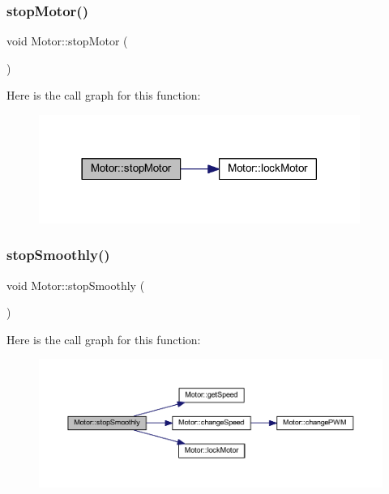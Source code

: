 \subsubsection{\texorpdfstring{stop\+Motor()}{stopMotor()}}
{\footnotesize\ttfamily void Motor\+::stop\+Motor (\begin{DoxyParamCaption}{ }\end{DoxyParamCaption})}

Here is the call graph for this function\+:\nopagebreak
\begin{figure}[H]
\begin{center}
\leavevmode
\includegraphics[width=297pt]{class_motor_a17eb92ef52d3cb10bc9f6b88b7c34dcc_cgraph}
\end{center}
\end{figure}
\mbox{\label{class_motor_af69697d5adb51106f4352c481d67fedd}} 
\subsubsection{\texorpdfstring{stop\+Smoothly()}{stopSmoothly()}}
{\footnotesize\ttfamily void Motor\+::stop\+Smoothly (\begin{DoxyParamCaption}{ }\end{DoxyParamCaption})}

Here is the call graph for this function\+:\nopagebreak
\begin{figure}[H]
\begin{center}
\leavevmode
\includegraphics[width=350pt]{class_motor_af69697d5adb51106f4352c481d67fedd_cgraph}
\end{center}
\end{figure}


